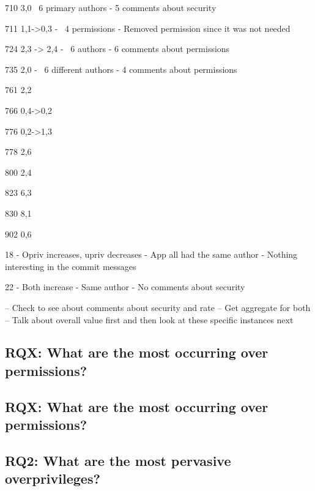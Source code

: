 \documentclass[conference]{IEEEtran}
\begin{document}
710 3,0
~6 primary authors
- 5 comments about security


711 1,1->0,3
- ~4 permissions
- Removed permission since it was not needed


724 2,3 -> 2,4
- ~6 authors
- 6 comments about permissions



735 2,0
- ~6 different authors
- 4 comments about permissions



761 2,2




766 0,4->0,2




776 0,2->1,3





778 2,6



800 2,4



823 6,3




830 8,1



902 0,6


18 - Opriv increases, upriv decreases
-	App all had the same author
-	Nothing interesting in the commit messages

22 - Both increase %
-	Same author
-	No comments about security




-- Check to see about comments about security and rate
--		Get aggregate for both
--		Talk about overall value first and then look at these specific instances next



\subsection{RQX: What are the most  occurring over permissions?}



\subsection{RQX: What are the most  occurring over permissions?}


\subsection{RQ2: What are the most pervasive overprivileges?}
\end{document}
